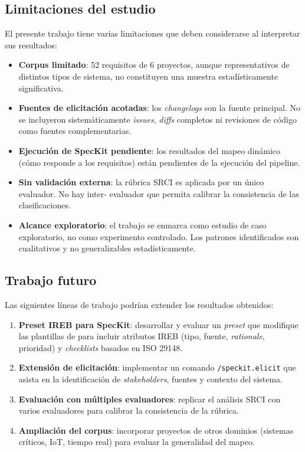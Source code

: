 \subsection{Limitaciones del estudio}

El presente trabajo tiene varias limitaciones que deben considerarse al interpretar sus resultados:

\begin{itemize}
    \item \textbf{Corpus limitado}: 52 requisitos de 6 proyectos, aunque representativos de distintos tipos de sistema, no constituyen una muestra estad\'isticamente significativa.
    \item \textbf{Fuentes de elicitaci\'on acotadas}: los \emph{changelogs} son la fuente principal. No se incluyeron sistem\'aticamente \emph{issues}, \emph{diffs} completos ni revisiones de c\'odigo como fuentes complementarias.
    \item \textbf{Ejecuci\'on de SpecKit pendiente}: los resultados del mapeo din\'amico (c\'omo responde \speckit{} a los requisitos) est\'an pendientes de la ejecuci\'on del pipeline.
    \item \textbf{Sin validaci\'on externa}: la r\'ubrica SRCI es aplicada por un \'unico evaluador. No hay inter- evaluador que permita calibrar la consistencia de las clasificaciones.
    \item \textbf{Alcance exploratorio}: el trabajo se enmarca como estudio de caso exploratorio, no como experimento controlado. Los patrones identificados son cualitativos y no generalizables estad\'isticamente.
\end{itemize}

\subsection{Trabajo futuro}

Las siguientes l\'ineas de trabajo podr\'ian extender los resultados obtenidos:

\begin{enumerate}
    \item \textbf{Preset IREB para SpecKit}: desarrollar y evaluar un \emph{preset} que modifique las plantillas de \speckit{} para incluir atributos IREB (tipo, fuente, \emph{rationale}, prioridad) y \emph{checklists} basados en ISO 29148.
    \item \textbf{Extensi\'on de elicitaci\'on}: implementar un comando \texttt{/speckit.elicit} que asista en la identificaci\'on de \emph{stakeholders}, fuentes y contexto del sistema.
    \item \textbf{Evaluaci\'on con m\'ultiples evaluadores}: replicar el an\'alisis SRCI con varios evaluadores para calibrar la consistencia de la r\'ubrica.
    \item \textbf{Ampliaci\'on del corpus}: incorporar proyectos de otros dominios (sistemas cr\'iticos, IoT, tiempo real) para evaluar la generalidad del mapeo.
\end{enumerate}
